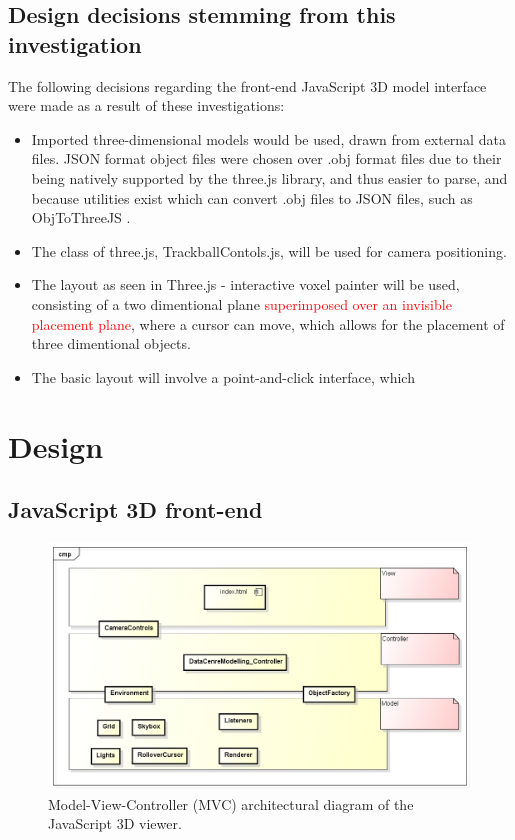 \subsection{Design decisions stemming from this investigation}
\label{subSec: Three.js: Design decisions stemming from this investigation}

The following decisions regarding the front-end JavaScript 3D model interface were made as a result of these investigations:

\begin{itemize}
\item Imported three-dimensional models would be used, drawn from external data files. JSON format object files were chosen over .obj format files due to their being natively supported by the three.js library, and thus easier to parse, and because utilities exist which can convert .obj files to JSON files, such as Obj\textunderscore To\textunderscore ThreeJS \cite{ObjToJSON}.

\item The class of three.js, TrackballContols.js, will be used for camera positioning.

\item The layout as seen in Three.js - interactive voxel painter \cite{ThreeJSVoxelPainter} will be used, consisting of a two dimentional plane \textcolor{red}{superimposed over an invisible placement plane}, where a cursor can move, which allows for the placement of three dimentional objects.

\item The basic layout will involve a point-and-click interface, which  
\end{itemize}

\section{Design}
\label{sec:Design}

\subsection{JavaScript 3D front-end}

\begin{figure}[H]
\centering
\includegraphics[width=5in]{Resources//Design_Diagrams//Component_JavaScript 3D model.png}
\caption{Model-View-Controller (MVC) architectural diagram of the JavaScript 3D viewer.}
\label{}
\end{figure}

